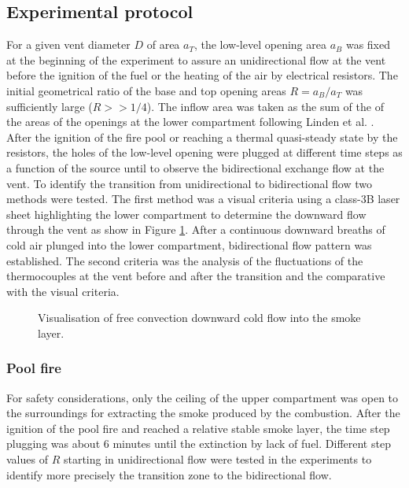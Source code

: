 \documentclass[preprint,12pt]{elsarticle}
\begin{document}
\subsection{Experimental protocol}
For a given vent diameter \(D\) of area \(a_T\), the low-level opening area \(a_B\) was fixed at the beginning of the experiment to assure an unidirectional flow at the vent before the ignition of the fuel or the heating of the air by electrical resistors. The initial geometrical ratio of the base and top opening areas \(R=a_B/a_T\) was sufficiently large (\(R>>1/4\)). The inflow area was taken as the sum of the of the areas of the openings at the lower compartment following Linden et al. \cite{linden_lane-serff_smeed_1990}. After the ignition of the fire pool or reaching a thermal quasi-steady state by the resistors, the holes of the low-level opening were plugged at different time steps as a function of the source until to observe the bidirectional exchange flow at the vent. To identify the transition from unidirectional to bidirectional flow two methods were tested. The first method was a visual criteria using a class-3B laser sheet highlighting the lower compartment to determine the downward flow through the vent as show in Figure \ref{fig:visu}. After a continuous downward breaths of cold air plunged into the lower compartment, bidirectional flow pattern was established. The second criteria was the analysis of the fluctuations of the thermocouples at the vent before and after the transition and the comparative with the visual criteria.

\begin{figure}[h]
\centering
{}
\caption{Visualisation of free convection downward cold flow into the smoke layer.}
\label{fig:visu}
\end{figure}

\subsubsection*{Pool fire}
For safety considerations, only the ceiling of the upper compartment was open to the surroundings for extracting the smoke produced by the combustion. After the ignition of the pool fire and reached a relative stable smoke layer, the time step plugging was about 6 minutes until the extinction by lack of fuel. Different step values of \(R\) starting in unidirectional flow were tested in the experiments to identify more precisely the transition zone to the bidirectional flow.
\end{document}

